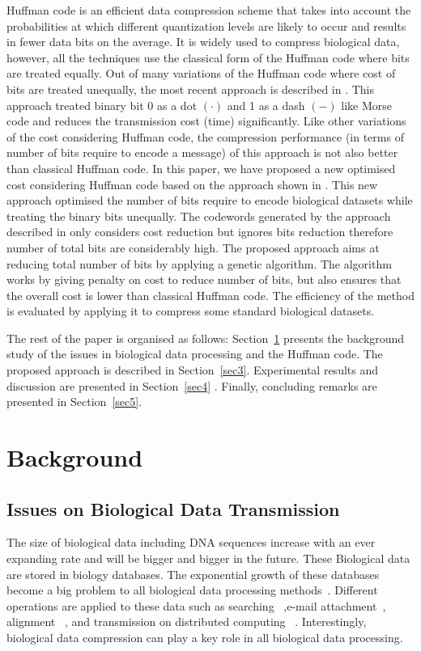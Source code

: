 \documentclass[preprint,12pt]{elsarticle}
\begin{document}
Huffman code is an efficient data compression scheme that takes into account the probabilities at which different quantization levels are likely to occur and results in fewer data bits on the average. It is widely used to compress biological data, however, all the techniques use the classical form of the Huffman code where bits are treated equally. Out of many variations of the Huffman code where cost of bits are treated unequally, the most recent approach is described in \cite{Kab14}. This approach treated binary bit 0 as a dot $\left(\cdot\right)$ and 1 as a dash $\left(-\right)$ like Morse code and reduces the transmission cost (time) significantly. Like other variations of the cost considering Huffman code, the compression performance (in terms of number of bits require to encode a message) of this approach is not also better than classical Huffman code. In this paper, we have proposed a new optimised cost considering Huffman code based on the approach shown in \cite{Kab14}. This new approach optimised the number of bits require to encode biological datasets while treating the binary bits unequally. The codewords generated by the approach described in\cite{Kab14} only considers cost reduction but ignores bits reduction therefore number of total bits are considerably high. The proposed approach aims at reducing total number of bits   by applying a genetic algorithm. The algorithm works by giving penalty on cost to reduce number of bits, but also ensures that the overall cost is lower than classical Huffman code.  The efficiency of the method is evaluated by applying it to compress some standard biological datasets.         

The rest of the paper is organised as follows: Section~\ref{sec2} presents the background study of the issues in biological data processing and the Huffman code. The proposed approach is described in Section~\ref{sec3}. Experimental results and discussion are presented in Section~\ref{sec4} . Finally, concluding remarks are presented in Section~\ref{sec5}.



\section{Background}
\label{sec2}
\subsection{Issues on Biological Data Transmission}
The size of biological data including DNA sequences increase with an ever expanding rate and will be bigger and bigger in the future. These Biological data are stored in biology databases. The exponential growth of these databases become a big problem to all biological data processing methods~\cite{Doug08}.
Different operations are applied to these data such as searching ~\cite{val10},e-mail attachment~\cite{chr09}, alignment ~\cite{che03}, and transmission on distributed computing ~\cite{cha14}. Interestingly, biological data compression can play a key role in all biological data processing. 
\end{document}
